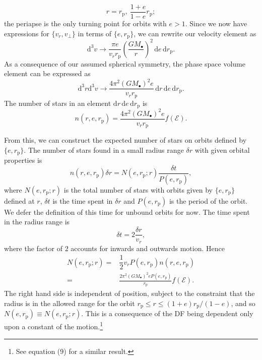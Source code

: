 \documentclass[useAMS,usedcolumn,usegraphicx,usenatbib]{mn2e}
\newcommand{\sub}[1]{\ensuremath{_\mathrm{#1}}}
\newcommand{\dd}{\ensuremath{\mathrm{d}}}
\newcommand{\recip}[1]{\ensuremath{\dfrac{1}{#1}}}
\begin{document}
\begin{equation}
r = r\sub{p}, \: \frac{1+e}{1-e}r\sub{p};
\end{equation}
the periapse is the only turning point for orbits with $e > 1$. Since we now have expressions for $\{v_r, v_\perp\}$ in terms of $\{e, r\sub{p}\}$, we can 
rewrite our velocity element as
\begin{equation}
\dd^3v \rightarrow \frac{\pi e}{v_rr\sub{p}}\left(\frac{GM_\bullet}{r}\right)^2\,\dd e \,\dd r\sub{p}.
\end{equation}
As a consequence of our assumed spherical symmetry, 
the phase space volume element can be expressed as
\begin{equation}
\dd^3r\dd^3v \rightarrow \frac{4\pi^2(GM_\bullet)^2e}{v_rr\sub{p}}\,\dd r\,\dd e \,\dd r\sub{p}.
\end{equation}
The number of stars in an element $\dd r\,\dd e\,\dd r\sub{p}$ is
\begin{equation}
n(r, e, r\sub{p}) = \frac{4\pi^2(GM_\bullet)^2e}{v_rr\sub{p}}f(\mathcal{E}).
\end{equation}

From this, we can construct the expected number of stars on orbits defined by $\{e, r\sub{p}\}$. The number of stars found in a small radius range $\delta r$ with given orbital properties is
\begin{equation}
n(r, e, r\sub{p})\delta r = N(e, r\sub{p}; r)\frac{\delta t}{P(e, r\sub{p})},
\end{equation}
where $N(e, r\sub{p}; r)$ is the total number of stars with orbits given by $\{e, r\sub{p}\}$ defined at $r$, $\delta t$ is the time spent in $\delta r$ and $P(e, r\sub{p})$ is the period of the orbit. We defer the definition of this time for unbound orbits for now. The time spent in the radius range is
\begin{equation}
\delta t = 2\frac{\delta r}{v_r},
\end{equation}
where the factor of $2$ accounts for inwards and outwards motion. Hence
\begin{align}
N(e, r\sub{p}; r) = {} & \recip{2} v_r P(e, r\sub{p}) n(r, e, r\sub{p}) \nonumber \\
 = {} & \frac{2\pi^2(GM_\bullet)^2 e P(e, r\sub{p})}{r\sub{p}}f(\mathcal{E}).
\end{align}
The right hand side is independent of position, subject to the constraint that the radius is in the allowed range for the orbit $r\sub{p} \leq r \leq (1+e)r\sub{p}/(1-e)$, and so $N(e, r\sub{p}) \equiv N(e, r\sub{p}; r)$. This is a consequence of the DF being dependent only upon a constant of the motion.\footnote{See \citet{Bahcall1976} equation (9) for a similar result.}
\end{document}
